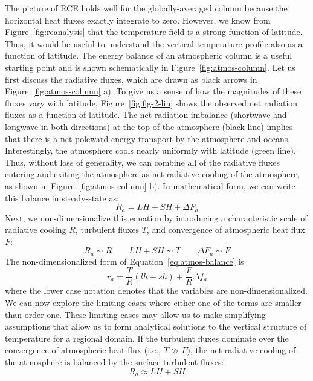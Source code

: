 \documentclass{article}
\begin{document}
The picture of RCE holds well for the globally-averaged column because the horizontal heat fluxes exactly integrate to zero. However, we know from Figure~\ref{fig:reanalysis} that the temperature field is a strong function of latitude. Thus, it would be useful to understand the vertical temperature profile also as a function of latitude. The energy balance of an atmospheric column is a useful starting point and is shown schematically in Figure~\ref{fig:atmos-column}. Let us first discuss the radiative fluxes, which are drawn as black arrows in Figure~\ref{fig:atmos-column} a). To give us a sense of how the magnitudes of these fluxes vary with latitude, Figure~\ref{fig:fig-2-lin} shows the observed net radiation fluxes as a function of latitude. The net radiation imbalance (shortwave and longwave in both directions) at the top of the atmosphere (black line) implies that there is a net poleward energy transport by the atmosphere and oceans. Interestingly, the atmosphere cools nearly uniformly with latitude (green line). Thus, without loss of generality, we can combine all of the radiative fluxes entering and exiting the atmosphere as net radiative cooling of the atmosphere, as shown in Figure~\ref{fig:atmos-column} b). In mathematical form, we can write this balance in steady-state as:
\begin{equation} \label{eq:atmos-balance}
R_a = LH + SH + \Delta F_a
\end{equation}
Next, we non-dimensionalize this equation by introducing a characteristic scale of radiative cooling $R$, turbulent fluxes $T$, and convergence of atmospheric heat flux $F$:
\begin{equation}
R_a \sim R \qquad LH+SH \sim T \qquad \Delta F_a \sim F
\end{equation}
The non-dimensionalized form of Equation~\ref{eq:atmos-balance} is
\begin{equation}
r_a = \frac{T}{R}(lh + sh) + \frac{F}{R}\Delta f_a
\end{equation}
where the lower case notation denotes that the variables are non-dimensionalized. We can now explore the limiting cases where either one of the terms are smaller than order one. These limiting cases may allow us to make simplifying assumptions that allow us to form analytical solutions to the vertical structure of temperature for a regional domain. If the turbulent fluxes dominate over the convergence of atmospheric heat flux (i.e., $T \gg F$), the net radiative cooling of the atmosphere is balanced by the surface turbulent fluxes:
\begin{equation}
R_a \approx LH + SH
\end{equation}
\end{document}
